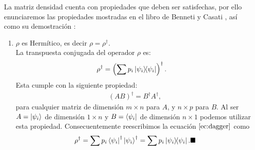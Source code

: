 \documentclass[letterpaper,12pt]{thesisECFM}
\theoremstyle{plain}
\theoremstyle{definition}
\theoremstyle{definition}
\theoremstyle{remark}
\newcommand{\1}{\mathbb{1}}
\begin{document}
La matriz densidad cuenta con propiedades que deben ser satisfechas, por ello
enunciaremos las propiedades mostradas en el libro de  Benneti y Casati
\cite{princip_quantum}, así como su demostración :
\begin{enumerate}
\item $\rho$ es Hermítico, es decir $\rho = \rho^{\dagger}.$\\ 
La transpuesta conjugada del operador $\rho$ es:
\begin{align}
    \label{ec:dagger}
    \rho^{\dagger}  & = \left( \sum p_i \ketbra{\psi_i}  \right)^{\dagger}.
\end{align}
Esta cumple con la siguiente propiedad:
\begin{align}
    (AB)^{\dagger} = B^{\dagger} A^{\dagger},
\end{align}
para cualquier matriz de dimensión $m\times n $ para $A$,  y $n \times p$ para
$B$. Al ser $A = \ket{\psi_i}$ de dimensión $1\times n$ y $B = \bra{\psi_i}$ de
dimensión $n \times 1$ podemos utilizar esta propiedad. Consecuentemente
reescribimos la ecuación $\ref{ec:dagger}$ como
\begin{align}
    \rho^{\dagger} = \sum p_i  \bra{\psi_i}^{\dagger} \ket{\psi_i}^{\dagger} = \sum p_i \ketbra{\psi_i}.  \blacksquare
\end{align}


\end{enumerate}
\end{document}
